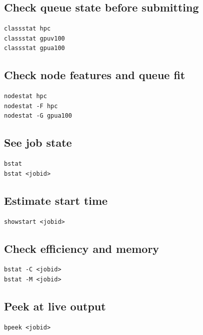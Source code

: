 \documentclass[11pt,a4paper]{article}
\begin{document}
\subsection{Check queue state before submitting}

\begin{lstlisting}[style=shell]
classstat hpc
classstat gpuv100
classstat gpua100
\end{lstlisting}

\subsection{Check node features and queue fit}

\begin{lstlisting}[style=shell]
nodestat hpc
nodestat -F hpc
nodestat -G gpua100
\end{lstlisting}

\subsection{See job state}

\begin{lstlisting}[style=shell]
bstat
bstat <jobid>
\end{lstlisting}

\subsection{Estimate start time}

\begin{lstlisting}[style=shell]
showstart <jobid>
\end{lstlisting}

\subsection{Check efficiency and memory}

\begin{lstlisting}[style=shell]
bstat -C <jobid>
bstat -M <jobid>
\end{lstlisting}

\subsection{Peek at live output}

\begin{lstlisting}[style=shell]
bpeek <jobid>
\end{lstlisting}
\end{document}
